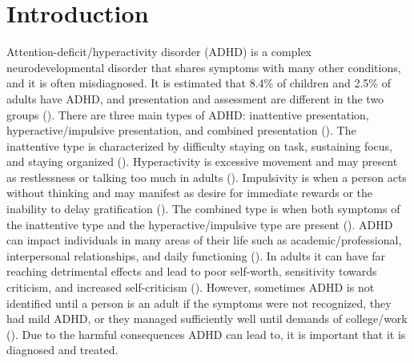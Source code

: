 \documentclass[,article,,moreauthors,pdftex]{mdpi}
\begin{document}

\hypertarget{introduction}{%
\section{Introduction}\label{introduction}}

Attention-deficit/hyperactivity disorder (ADHD) is a complex
neurodevelopmental disorder that shares symptoms with many other
conditions, and it is often misdiagnosed. It is estimated that 8.4\% of
children and 2.5\% of adults have ADHD, and presentation and assessment
are different in the two groups (\citet{noauthor_what_nodate}). There
are three main types of ADHD: inattentive presentation,
hyperactive/impulsive presentation, and combined presentation
(\citet{noauthor_what_nodate}). The inattentive type is characterized by
difficulty staying on task, sustaining focus, and staying organized
(\citet{noauthor_attention-deficithyperactivity_nodate}). Hyperactivity
is excessive movement and may present as restlessness or talking too
much in adults (\citet{noauthor_attention-deficithyperactivity_nodate}).
Impulsivity is when a person acts without thinking and may manifest as
desire for immediate rewards or the inability to delay gratification
(\citet{noauthor_attention-deficithyperactivity_nodate}). The combined
type is when both symptoms of the inattentive type and the
hyperactive/impulsive type are present
(\citet{noauthor_attention-deficithyperactivity_nodate}). ADHD can
impact individuals in many areas of their life such as
academic/professional, interpersonal relationships, and daily
functioning (\citet{noauthor_what_nodate}). In adults it can have far
reaching detrimental effects and lead to poor self-worth, sensitivity
towards criticism, and increased self-criticism
(\citet{noauthor_what_nodate}). However, sometimes ADHD is not
identified until a person is an adult if the symptoms were not
recognized, they had mild ADHD, or they managed sufficiently well until
demands of college/work
(\citet{noauthor_attention-deficithyperactivity_nodate2}). Due to the
harmful consequences ADHD can lead to, it is important that it is
diagnosed and treated.
\end{document}
